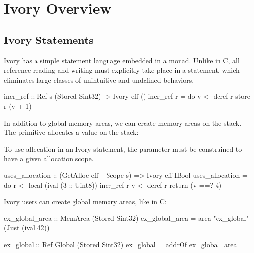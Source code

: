 \section{Ivory Overview}
\label{sec:ivory-overview}



\subsection{Ivory Statements}


Ivory has a simple statement language embedded in a monad. Unlike in C, all
reference reading and writing must explicitly take place in a statement, which
eliminates large classes of unintuitive and undefined behaviors.


\begin{code}
incr_ref :: Ref s (Stored Sint32) -> Ivory eff ()
incr_ref r = do
    v <- deref r
    store r (v + 1)
\end{code}


In addition to global memory areas, we can create memory areas on the stack.
The  primitive allocates a value on the stack:

To use allocation in an Ivory statement, the  parameter must be
constrained to have a given allocation scope.

\begin{code}

uses_allocation :: (GetAlloc eff ~ Scope s)
                => Ivory eff IBool
uses_allocation = do
  r <- local (ival (3 :: Uint8))
  incr_ref r
  v <- deref r
  return (v ==? 4)

\end{code}

Ivory users can create global memory areas, like in C:
\begin{code}
ex_global_area :: MemArea (Stored Sint32)
ex_global_area = area "ex_global" (Just (ival 42))

ex_global :: Ref Global (Stored Sint32)
ex_global = addrOf ex_global_area
\end{code}

